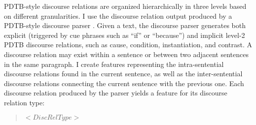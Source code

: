 PDTB-style discourse relations \cite{PDTB08} are organized
hierarchically in three levels based on different granularities.  I
use the discourse relation output produced by a PDTB-style
discourse parser \cite{PDTBparser10}.  
Given a text, the discourse parser
generates both explicit  (triggered by cue phrases such as ``if'' or
``because'') and implicit level-2 PDTB discourse relations, such as
cause, condition, instantiation, and
contrast.
A discourse relation may exist within a sentence or between two
adjacent sentences in the same paragraph.  I create features
representing the intra-sentential discourse relations found in the
current sentence, as well as the inter-sentential discourse relations
connecting the current sentence with the previous one.
Each  discourse relation produced by the parser yields a  feature for its discourse relation type:
\vspace*{.08in}
\begin{quote}
{\it $<DiscRelType>$}
\end{quote}
\vspace*{.08in}


